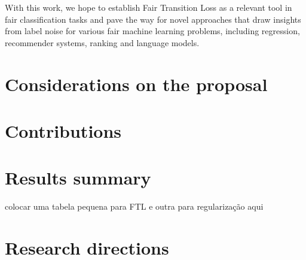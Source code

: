 With this work, we hope to establish Fair Transition Loss as a relevant tool in fair classification tasks and pave the way for novel approaches that draw insights from label noise for various fair machine learning problems, including regression, recommender systems, ranking and language models.

\section{Considerations on the proposal}

\section{Contributions}

\section{Results summary}

colocar uma tabela pequena para FTL e outra para regularização aqui

\section{Research directions}